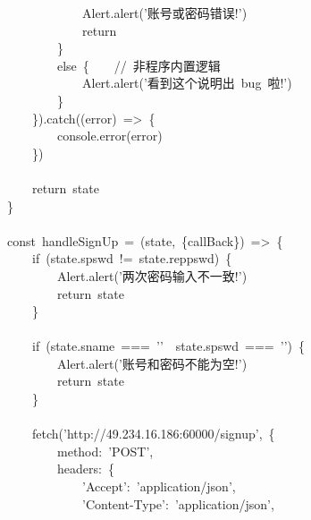 \documentclass{article}
\begin{document}
\begin{mdpre}
~~~~~~~~~~~~Alert.alert({'}{账号或密码错误!}{'})\\
~~~~~~~~~~~~{return}\\
~~~~~~~~\}\\
~~~~~~~~{else}~\{~~~~{//~非程序内置逻辑}\\
~~~~~~~~~~~~Alert.alert({'}{看到这个说明出~bug~啦!}{'})\\
~~~~~~~~\}\\
~~~~\}).{catch}((error)~=\textgreater{}~\{\\
~~~~~~~~console.error(error)\\
~~~~\})\\
\\
~~~~{return}~state\\
\}\\
\\
{const}~handleSignUp~=~(state,~\{callBack\})~=\textgreater{}~\{\\
~~~~{if}~(state.spswd~!=~state.reppswd)~\{\\
~~~~~~~~Alert.alert({'}{两次密码输入不一致!}{'})\\
~~~~~~~~{return}~state\\
~~~~\}\\
\\
~~~~{if}~(state.sname~===~{'}{'}~\textbar{}\textbar{}~state.spswd~===~{'}{'})~\{\\
~~~~~~~~Alert.alert({'}{账号和密码不能为空!}{'})\\
~~~~~~~~{return}~state\\
~~~~\}\\
\\
~~~~fetch({'}{http://49.234.16.186:60000/signup}{'},~\{\\
~~~~~~~~method:~{'}{POST}{'},\\
~~~~~~~~headers:~\{\\
~~~~~~~~~~~~{'}{Accept}{'}:~{'}{application/json}{'},\\
~~~~~~~~~~~~{'}{Content-Type}{'}:~{'}{application/json}{'},\\

\end{mdpre}
\end{document}
